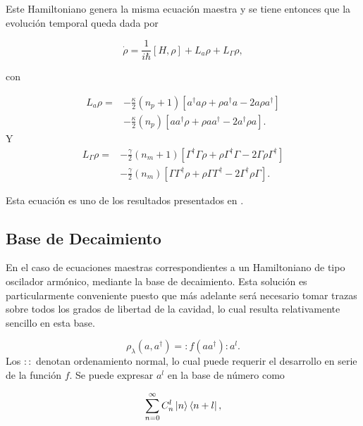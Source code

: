 \documentclass[10pt,a4paper]{report}
\begin{document}
Este Hamiltoniano genera la misma ecuación maestra y se tiene entonces que la evolución temporal queda dada por

\begin{equation}\label{LCMasterEq}
\dot{\rho} = \frac{1}{i\hbar}[H,\rho] +L_a\rho + L_\Gamma \rho,
\end{equation} 

con


\begin{align}
L_a \rho =& - \frac{\kappa}{2}(n_p + 1)[a^\dagger a\rho + \rho a^\dagger a -2a\rho a^\dagger]  \\
 &- \frac{\kappa}{2}(n_p)[ aa^\dagger\rho + \rho  aa^\dagger -2a^\dagger\rho a].\nonumber
\end{align}
 Y 
\begin{align}
L_\Gamma \rho =& - \frac{\gamma}{2}(n_m + 1)[\Gamma^\dagger \Gamma\rho + \rho \Gamma^\dagger \Gamma -2\Gamma\rho \Gamma^\dagger]  \\
 &- \frac{\gamma}{2}(n_m)[ \Gamma\Gamma^\dagger\rho + \rho  \Gamma\Gamma^\dagger -2\Gamma^\dagger\rho \Gamma].\nonumber
\end{align} 

Esta ecuación es uno de los resultados presentados en \cite{YanesOC}.

\subsection{Base de Decaimiento}

En el caso de ecuaciones maestras correspondientes a un Hamiltoniano
de tipo oscilador armónico,  mediante la base de decaimiento\cite{EnglertDB}. Esta solución es particularmente conveniente puesto que más adelante será necesario tomar trazas sobre todos los grados de libertad de la cavidad, lo cual resulta relativamente sencillo en esta base.

\begin{equation}\label{Englert1993}
\rho_\lambda (a,a^\dagger) = :f(aa^\dagger):a^l.
\end{equation} Los $::$ denotan ordenamiento normal, lo cual puede requerir el desarrollo en serie de la función $f$. Se puede expresar $a^l$ en la base de número como

\begin{equation}
\sum_{n=0}^\infty C_n^l\Ket{n}\Bra{n+l},
\end{equation}
\end{document}
